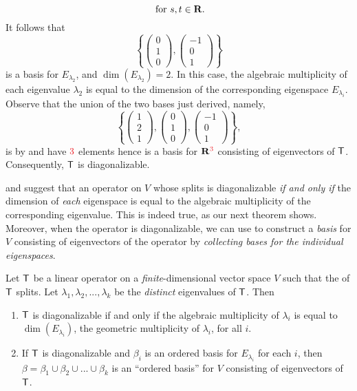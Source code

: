 \begin{example}
\[    \text { for } s, t \in \mathbf{R}.
\]
It follows that
\[
    \left\{
        \begin{pmatrix} 0 \\ 1 \\ 0 \end{pmatrix},
        \begin{pmatrix} -1 \\ 0 \\ 1 \end{pmatrix}
    \right\}
\]
is a basis for \(E_{\lambda_2}\), and \(\dim(E_{\lambda_2}) = 2\).
In this case, the algebraic multiplicity of each eigenvalue \(\lambda_2\) is equal to the dimension of the corresponding eigenspace \(E_{\lambda_i}\).
Observe that the union of the two bases just derived, namely,
\[
    \left\{
        \begin{pmatrix} 1 \\ 2 \\ 1 \end{pmatrix},
        \begin{pmatrix} 0 \\ 1 \\ 0 \end{pmatrix},
        \begin{pmatrix} -1 \\ 0 \\ 1 \end{pmatrix}
    \right\},
\]
is \LID{} by  and have \(\RED{3}\) elements hence is a basis for \(\SET{R}^{\RED{3}}\) consisting of eigenvectors of \(\textsf{T}\).
Consequently, \(\textsf{T}\) is diagonalizable.
\end{example}

 and  suggest that an operator on \(V\) whose \CPOLY{} splits is diagonalizable \emph{if and only if} the dimension of \emph{each} eigenspace is equal to the algebraic multiplicity of the corresponding eigenvalue.
This is indeed true, as our next theorem shows.
Moreover, when the operator is diagonalizable, we can use  to construct a \emph{basis} for \(V\) consisting of eigenvectors of the operator by \emph{collecting bases for the individual eigenspaces}.

\begin{theorem} \label{thm 5.8}
Let \(\textsf{T}\) be a linear operator on a \emph{finite}-dimensional vector space \(V\) such that the \CPOLY{} of \(\textsf{T}\) splits.
Let \(\lambda_1, \lambda_2, ..., \lambda_k\) be the \emph{distinct} eigenvalues of \(\textsf{T}\).
Then
\begin{enumerate}
\item \(\textsf{T}\) is diagonalizable if and only if the algebraic multiplicity of \(\lambda_i\) is equal to \(\dim(E_{\lambda_i})\), the geometric multiplicity of \(\lambda_i\), for all \(i\).
\item If \(\textsf{T}\) is diagonalizable and \(\beta_i\) is an ordered basis for \(E_{\lambda_i}\) for each \(i\), then \(\beta = \beta_1 \cup \beta_2 \cup ... \cup \beta_k\) is an ``ordered basis''\RED{*} for \(V\) consisting of eigenvectors of \(\textsf{T}\).
\end{enumerate}
\end{theorem}

